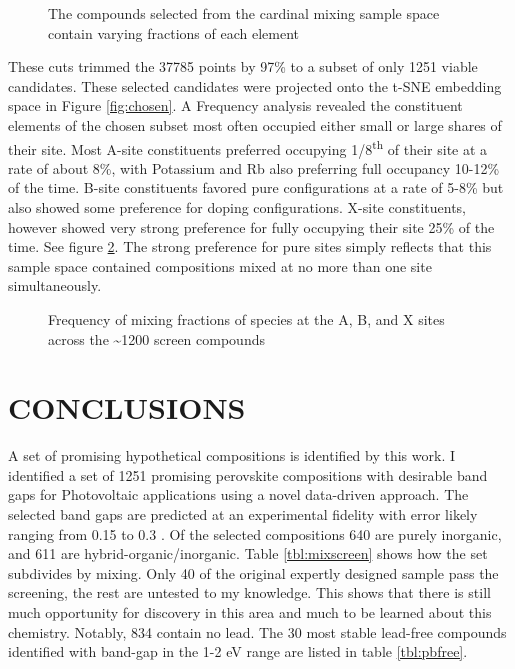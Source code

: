  
\begin{figure}[htbp]
\centering

\caption{\label{fig:chosenstats} The compounds selected from the cardinal mixing sample space contain varying fractions of each element}
\end{figure}

These cuts trimmed the 37785 points by 97\% to a subset of only 1251 viable candidates.
These selected candidates were projected onto the t-SNE embedding space in Figure \ref{fig:chosen}.
A Frequency analysis revealed the constituent elements of the chosen subset most often occupied either small or large shares of their site.
Most A-site constituents preferred occupying 1/8\textsuperscript{th} of their site at a rate of about 8\%, with Potassium and Rb also preferring full occupancy 10-12\% of the time.
B-site constituents favored pure configurations at a rate of 5-8\% but also showed some preference for doping configurations.
X-site constituents, however showed very strong preference for fully occupying their site 25\% of the time.
See figure \ref{fig:freq}.
The strong preference for pure sites simply reflects that this sample space contained compositions mixed at no more than one site simultaneously.

 
\begin{figure}[htbp]
\centering

\caption{\label{fig:freq} Frequency of mixing fractions of species at the A, B, and X sites across the \textasciitilde{}1200 screen compounds}
\end{figure}

\chapter{CONCLUSIONS}
\label{sec:org1da08e8}
A set of promising hypothetical compositions is identified by this work.
I identified a set of 1251 promising perovskite compositions with desirable band gaps for Photovoltaic applications using a novel data-driven approach.
The selected band gaps are predicted at an experimental fidelity with error likely ranging from 0.15 to 0.3 \unit{\eectronvolt}.
Of the selected compositions 640 are purely inorganic, and 611 are hybrid-organic/inorganic.
Table \ref{tbl:mixscreen} shows how the set subdivides by mixing.
Only 40 of the original expertly designed sample pass the screening, the rest are untested to my knowledge.
This shows that there is still much opportunity for discovery in this area and much to be learned about this chemistry.
Notably, 834 contain no lead.
The 30 most stable lead-free compounds identified with band-gap in the 1-2 \unit{\electronvolt} range are listed in table \ref{tbl:pbfree}.


